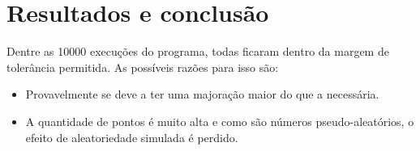 \documentclass[paper=a4wide, fontsize=10pt]{scrartcl}	 %
\begin{document}
\section{Resultados e conclusão}

Dentre as 10000 execuções do programa, todas ficaram dentro da margem de tolerância permitida. As possíveis razões para isso são:

\begin{itemize}
    \item Provavelmente se deve a ter uma majoração maior do
que a necessária. 
    \item  A quantidade de pontos é muito alta e como são números
pseudo-aleatórios, o efeito de aleatoriedade simulada é perdido.
\end{itemize}


\end{document}
